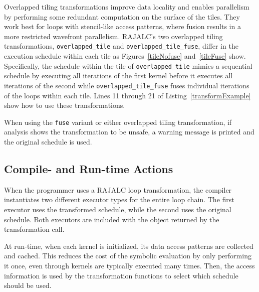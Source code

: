 Overlapped tiling transformations improve data locality
and enables parallelism by performing some redundant computation 
on the surface of the tiles.
They work best for loops with stencil-like access patterns,
where fusion results in a more restricted wavefront parallelism.
RAJALC's two overlapped tiling transformations, \verb.overlapped_tile. and
\verb.overlapped_tile_fuse., differ in the execution schedule within each tile
as Figures~\ref{tileNofuse} and~\ref{tileFuse} show.
Specifically, the schedule within the tile of \verb.overlapped_tile. mimics
a sequential schedule by executing all iterations of the first kernel before
it executes all iterations of the second while \verb.overlapped_tile_fuse.
fuses individual iterations of the loops within each tile.
Lines 11 through 21 of Listing~\ref{transformExample} show how to use these transformations.

When using the \verb.fuse. variant or either overlapped tiling transformation, if analysis shows the transformation to be unsafe, a warning message is printed and the original schedule is used. 

\subsection{Compile- and Run-time Actions}

When the programmer uses a RAJALC loop transformation, the compiler instantiates two different executor types for the entire loop chain. 
The first executor uses the transformed schedule, while the second uses the original schedule. 
Both executors are included with the object returned by the transformation call.

At run-time, when each kernel is initialized, its data access patterns are collected and cached. 
This reduces the cost of the symbolic evaluation by only performing it once, even through kernels are typically executed many times.
Then, the access information is used by the transformation functions to select which schedule should be used.


